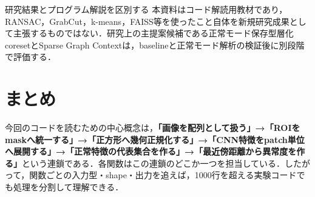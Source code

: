 \documentclass[a4paper,11pt]{ltjsreport}
\begin{document}
\begin{warnbox}{研究結果とプログラム解説を区別する}
本資料はコード解読用教材であり，RANSAC，GrabCut，k-means，FAISS等を使ったこと自体を新規研究成果として主張するものではない．研究上の主提案候補である正常モード保存型層化coresetとSparse Graph Contextは，baselineと正常モード解析の検証後に別段階で評価する．
\end{warnbox}

\chapter*{まとめ}
今回のコードを読むための中心概念は，\textbf{「画像を配列として扱う」→「ROIをmaskへ統一する」→「正方形へ幾何正規化する」→「CNN特徴をpatch単位へ展開する」→「正常特徴の代表集合を作る」→「最近傍距離から異常度を作る」}という連鎖である．各関数はこの連鎖のどこか一つを担当している．したがって，関数ごとの入力型・shape・出力を追えば，1000行を超える実験コードでも処理を分割して理解できる．
\end{document}
